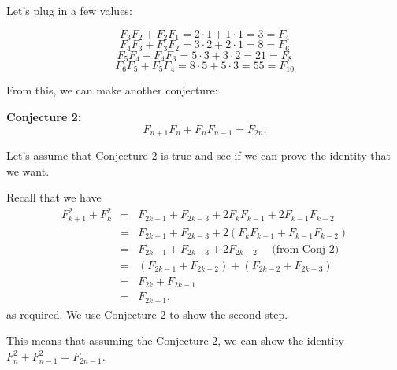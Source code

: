 \begin{frame}
  Let's plug in a few values:
  
  \[ F_3F_2+F_2F_1 = 2\cdot 1 + 1\cdot 1 = 3 = F_4 \] 
  \[ F_4F_3+F_3F_2 = 3\cdot 2 + 2\cdot 1 = 8 = F_6 \] 
  \[ F_5F_4+F_4F_3 = 5\cdot 3 + 3\cdot 2 = 21 = F_8 \] 
  \[ F_6F_5+F_5F_4 = 8\cdot 5 + 5\cdot 3 = 55 = F_{10} \]

  From this, we can make another conjecture:
  \begin{tcolorbox}
    {\bf Conjecture 2:}
    \[
    F_{n+1}F_n + F_nF_{n-1} = F_{2n}.
    \]
  \end{tcolorbox}
\end{frame}

\begin{frame}
  Let's assume that Conjecture 2 is true and see if we can prove the
  identity that we want.

  Recall that we have
  \begin{eqnarray*}
    F_{k+1}^2 + F_{k}^2
    &=& F_{2k-1} + F_{2k-3} + 2F_kF_{k-1} + 2F_{k-1}F_{k-2} \\
    &=& F_{2k-1} + F_{2k-3} + 2(F_kF_{k-1} + F_{k-1}F_{k-2}) \\
    &=& F_{2k-1} + F_{2k-3} + 2F_{2k-2} \ \ \ \ \ \ \mbox{(from Conj 2)}\\
    &=& (F_{2k-1} + F_{2k-2}) + (F_{2k-2} + F_{2k-3})\\
    &=& F_{2k} + F_{2k-1}\\
    &=& F_{2k+1},
  \end{eqnarray*}
  as required.  We use Conjecture 2 to show the second step.

  \vspace{0.1in} This means that assuming the Conjecture 2, we can
  show the identity $F_n^2+F_{n-1}^2 = F_{2n-1}$.
\end{frame}

